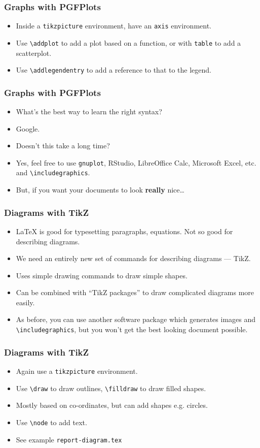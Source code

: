 \documentclass{beamer}
\begin{document}
\begin{frame}
	\frametitle{Graphs with PGFPlots}
	\begin{itemize}
		\item Inside a \texttt{tikzpicture} environment, have an \texttt{axis} environment.
		\item Use \texttt{\textbackslash{}addplot} to add a plot based on a function, or with \texttt{table} to add a scatterplot.
		\item Use \texttt{\textbackslash{}addlegendentry} to add a reference to that to the legend.
	\end{itemize}
\end{frame}

\begin{frame}
	\frametitle{Graphs with PGFPlots}
	\begin{itemize}
		\item What's the best way to learn the right syntax?
		\item Google.
		\item Doesn't this take a long time?
		\item Yes, feel free to use \texttt{gnuplot}, RStudio, LibreOffice Calc, Microsoft Excel, etc. and \texttt{\textbackslash{}includegraphics}.
		\item But, if you want your documents to look \textbf{really} nice\dots
	\end{itemize}
\end{frame}

\begin{frame}
	\frametitle{Diagrams with TikZ}
	\begin{itemize}
		\item \LaTeX{} is good for typesetting paragraphs, equations. Not so good for describing diagrams.
		\item We need an entirely new set of commands for describing diagrams --- TikZ.
		\item Uses simple drawing commands to draw simple shapes.
		\item Can be combined with ``TikZ packages'' to draw complicated diagrams more easily.
		\item As before, you can use another software package which generates images and \texttt{\textbackslash{}includegraphics}, but you won't get the best looking document possible.
	\end{itemize}
\end{frame}

\begin{frame}
	\frametitle{Diagrams with TikZ}
	\begin{itemize}
		\item Again use a \texttt{tikzpicture} environment.
		\item Use \texttt{\textbackslash{}draw} to draw outlines, \texttt{\textbackslash{}filldraw} to draw filled shapes.
		\item Mostly based on co-ordinates, but can add shapes e.g. circles.
		\item Use \texttt{\textbackslash{}node} to add text.
		\item See example \texttt{report-diagram.tex}
	\end{itemize}
\end{frame}
\end{document}
